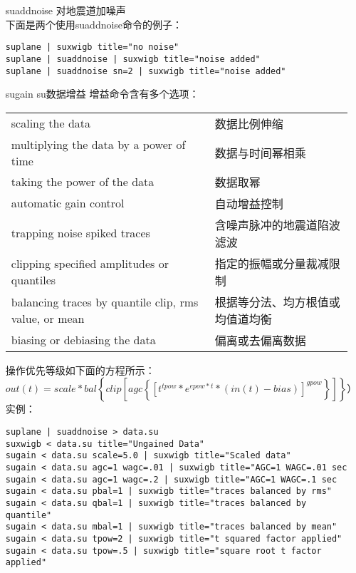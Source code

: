 \begin{enumerate}
	\item[suaddnoise] 对地震道加噪声\\	
	下面是两个使用suaddnoise命令的例子：
\begin{lstlisting}
suplane | suxwigb title="no noise" 
suplane | suaddnoise | suxwigb title="noise added" 
suplane | suaddnoise sn=2 | suxwigb title="noise added" 
\end{lstlisting}
	\item[sugain] su数据增益
	增益命令含有多个选项：\par\vspace{0.1em}
	\begin{tabular}{p{}p{}}
	\toprule
	scaling the data & 数据比例伸缩\\
	multiplying the data by a power of time & 数据与时间幂相乘\\
	taking the power of the data & 数据取幂\\
	automatic gain control & 自动增益控制\\
	trapping noise spiked traces & 含噪声脉冲的地震道陷波滤波\\
	clipping specified amplitudes or quantiles & 指定的振幅或分量裁减限制\\
	balancing traces by quantile clip, rms value, or mean &根据等分法、均方根值或均值道均衡\\
	biasing or debiasing the data & 偏离或去偏离数据 \\
	\bottomrule
	\end{tabular}\par\mvspace
	操作优先等级如下面的方程所示：
	$$out(t) = scale*bal\left\lbrace clip\left[ agc\left\lbrace \left[ t^{tpow}*e^{epow*t}*\left( in(t)-bias\right) \right] ^{gpow}\right\rbrace \right] \right\rbrace ）$$
	实例：
\begin{lstlisting}
suplane | suaddnoise > data.su
suxwigb < data.su title="Ungained Data" 	
sugain < data.su scale=5.0 | suxwigb title="Scaled data" 	
sugain < data.su agc=1 wagc=.01 | suxwigb title="AGC=1 WAGC=.01 sec 	
sugain < data.su agc=1 wagc=.2 | suxwigb title="AGC=1 WAGC=.1 sec 	
sugain < data.su pbal=1 | suxwigb title="traces balanced by rms" 
sugain < data.su qbal=1 | suxwigb title="traces balanced by quantile" 	
sugain < data.su mbal=1 | suxwigb title="traces balanced by mean" 	
sugain < data.su tpow=2 | suxwigb title="t squared factor applied" 	
sugain < data.su tpow=.5 | suxwigb title="square root t factor applied" 
\end{lstlisting}

\end{enumerate}
